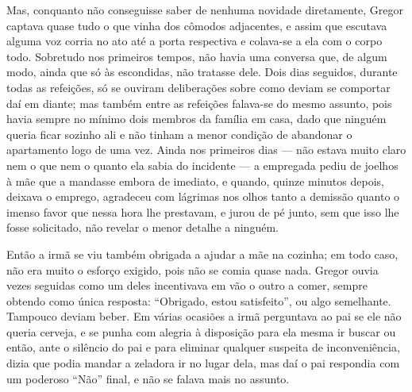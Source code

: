 Mas, conquanto não conseguisse saber de nenhuma novidade diretamente,
Gregor captava quase tudo o que vinha dos cômodos adjacentes, e assim que
escutava alguma voz corria no ato até a porta respectiva e colava-se a ela
com o corpo todo. Sobretudo nos primeiros tempos, não havia uma conversa
que, de algum modo, ainda que só às escondidas, não tratasse dele. Dois
dias seguidos, durante todas as refeições, só se ouviram deliberações
sobre como deviam se comportar daí em diante; mas também entre as
refeições falava-se do mesmo assunto, pois havia sempre no mínimo dois
membros da família em casa, dado que ninguém queria ficar sozinho ali e
não tinham a menor condição de abandonar o apartamento logo de uma vez.
Ainda nos primeiros dias --- não estava muito claro nem o que nem o quanto
ela sabia do incidente --- a empregada pediu de joelhos à mãe que a mandasse
embora de imediato, e quando, quinze minutos depois, deixava o emprego,
agradeceu com lágrimas nos olhos tanto a demissão quanto o imenso favor
que nessa hora lhe prestavam, e jurou de pé junto, sem que isso lhe fosse
solicitado, não revelar o menor detalhe a ninguém.

Então a irmã se viu também obrigada a ajudar a mãe na cozinha; em todo
caso, não era muito o esforço exigido, pois não se comia quase nada.
Gregor ouvia vezes seguidas como um deles incentivava em vão o outro a
comer, sempre obtendo como única resposta: “Obrigado, estou satisfeito”,
ou algo semelhante. Tampouco deviam beber. Em várias ocasiões a irmã
perguntava ao pai se ele não queria cerveja, e se punha com alegria à
disposição para ela mesma ir buscar ou então, ante o silêncio do pai e
para eliminar qualquer suspeita de inconveniência, dizia que podia mandar
a zeladora ir no lugar dela, mas daí o pai respondia com um poderoso “Não”
final, e não se falava mais no assunto.


